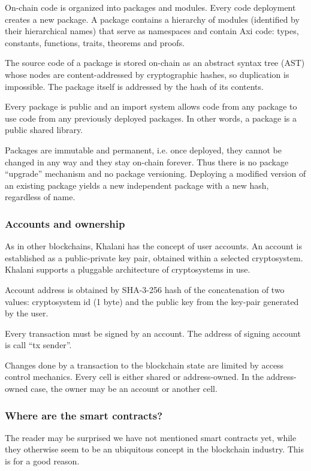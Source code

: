 \documentclass[a4paper]{article}
\begin{document}
On-chain code is organized into packages and modules. Every code deployment creates a new package. A package contains a hierarchy of modules (identified by their hierarchical names) that serve as namespaces and contain Axi code: types, constants, functions, traits, theorems and proofs.

The source code of a package is stored on-chain as an abstract syntax tree (AST) whose nodes are content-addressed by cryptographic hashes, so duplication is impossible. The package itself is addressed by the hash of its contents.

Every package is public and an import system allows code from any package to use code from any previously deployed packages. In other words, a package is a public shared library.

Packages are immutable and permanent, i.e. once deployed, they cannot be changed in any way and they stay on-chain forever. Thus there is no package ``upgrade'' mechanism and no package versioning. Deploying a modified version of an existing package yields a new independent package with a new hash, regardless of name.

\subsubsection{Accounts and ownership}

As in other blockchains, Khalani has the concept of user accounts. An account is established as a public-private key pair, obtained within a selected cryptosystem. Khalani supports a pluggable architecture of cryptosystems in use.

Account address is obtained by SHA-3-256 hash of the concatenation of two values: cryptosystem id (1 byte) and the public key from the key-pair generated by the user.

Every transaction must be signed by an account. The address of signing account is call ``tx sender''.

Changes done by a transaction to the blockchain state are limited by access control mechanics. Every cell is either shared or address-owned. In the address-owned case, the owner may be an account or another cell.

\subsubsection{Where are the smart contracts?}

The reader may be surprised we have not mentioned smart contracts yet, while they otherwise seem to be an ubiquitous concept in the blockchain industry. This is for a good reason.
\end{document}
